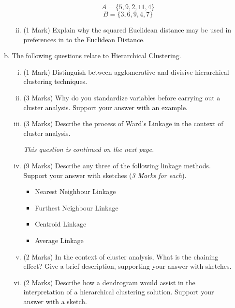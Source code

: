 \documentclass[a4paper,12pt]{article}
\begin{document}
\begin{enumerate}
\begin{enumerate}[(a)]
\begin{enumerate}[(i)]
	
		\[ A = \{5,9,2,11,4\}\]
		\[ B = \{3,6,9,4,7\}\]
		\item (1 Mark) Explain why the squared Euclidean distance may be used in preferences in to the Euclidean Distance.
	\end{enumerate}



\bigskip 
\item The following questions relate to Hierarchical Clustering.


\begin{enumerate}[(i)]
\item (1 Mark) Distinguish between agglomerative and divisive hierarchical clustering techniques.
	
\item (3 Marks) Why do you standardize variables before carrying out a cluster analysis. Support your answer with an example.

\item (3 Marks) Describe the process of Ward's Linkage in the context of cluster analysis.


\noindent \textit{This question is continued on the next page.}
\newpage	
\item (9 Marks)  Describe any three of the following linkage methods. Support your answer with sketches (\textit{3 Marks for each}).
	\begin{itemize}
		\item Nearest Neighbour Linkage
		\item Furthest Neighbour Linkage
		\item Centroid Linkage
		\item Average Linkage
	\end{itemize}

	\item (2 Marks) In the context of cluster analysis, What is the chaining effect? Give a brief description, supporting your answer with sketches.
%	
	\item (2 Marks) Describe how a dendrogram would assist in the interpretation of a hierarchical clustering solution. Support your answer with a sketch.
	

	
\end{enumerate}



\end{enumerate}
\end{enumerate}
\end{document}

